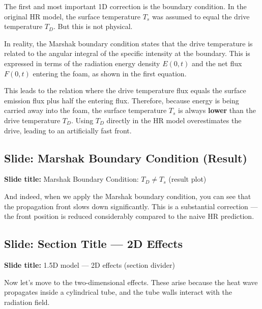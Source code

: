 \documentclass[12pt, a4paper]{article}
\begin{document}
The first and most important 1D correction is the boundary condition. In the original HR model, the surface temperature $T_s$ was assumed to equal the drive temperature $T_D$. But this is not physical.

In reality, the Marshak boundary condition states that the drive temperature is related to the angular integral of the specific intensity at the boundary. This is expressed in terms of the radiation energy density $E(0,t)$ and the net flux $F(0,t)$ entering the foam, as shown in the first equation.

This leads to the relation where the drive temperature flux equals the surface emission flux plus half the entering flux. Therefore, because energy is being carried away into the foam, the surface temperature $T_s$ is always \textbf{lower} than the drive temperature $T_D$. Using $T_D$ directly in the HR model overestimates the drive, leading to an artificially fast front.

\subsection{Slide: Marshak Boundary Condition (Result)}

\begin{slidebox}
\textbf{Slide title:} Marshak Boundary Condition: $T_D \neq T_s$ (result plot)
\end{slidebox}

And indeed, when we apply the Marshak boundary condition, you can see that the propagation front slows down significantly. This is a substantial correction --- the front position is reduced considerably compared to the naive HR prediction.

\subsection{Slide: Section Title --- 2D Effects}

\begin{slidebox}
\textbf{Slide title:} 1.5D model --- 2D effects (section divider)
\end{slidebox}

Now let's move to the two-dimensional effects. These arise because the heat wave propagates inside a cylindrical tube, and the tube walls interact with the radiation field.
\end{document}
